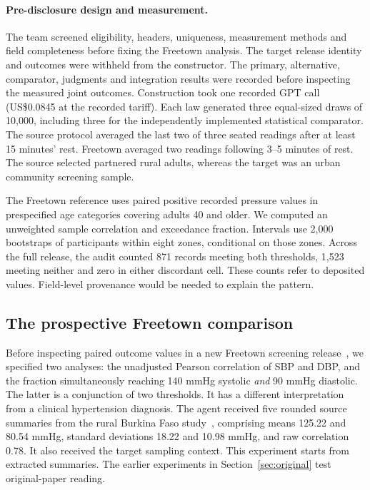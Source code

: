 \paragraph{Pre-disclosure design and measurement.}
The team screened eligibility, headers, uniqueness, measurement methods and field completeness before fixing the Freetown analysis. The target release identity and outcomes were withheld from the constructor. The primary, alternative, comparator, judgments and integration results were recorded before inspecting the measured joint outcomes. Construction took one recorded GPT call (US\$0.0845 at the recorded tariff). Each law generated three equal-sized draws of 10,000, including three for the independently implemented statistical comparator. The source protocol averaged the last two of three seated readings after at least 15 minutes' rest. Freetown averaged two readings following 3--5 minutes of rest. The source selected partnered rural adults, whereas the target was an urban community screening sample.

The Freetown reference uses paired positive recorded pressure values in prespecified age categories covering adults 40 and older. We computed an unweighted sample correlation and exceedance fraction. Intervals use 2,000 bootstraps of participants within eight zones, conditional on those zones. Across the full release, the audit counted 871 records meeting both thresholds, 1,523 meeting neither and zero in either discordant cell. These counts refer to deposited values. Field-level provenance would be needed to explain the pattern.



\subsection{The prospective Freetown comparison}
Before inspecting paired outcome values in a new Freetown screening release~\cite{freetown,freetowndata}, we specified two analyses: the unadjusted Pearson correlation of SBP and DBP, and the fraction simultaneously reaching 140 mmHg systolic \emph{and} 90 mmHg diastolic. The latter is a conjunction of two thresholds. It has a different interpretation from a clinical hypertension diagnosis. The agent received five rounded source summaries from the rural Burkina Faso study~\cite{jaspert}, comprising means 125.22 and 80.54 mmHg, standard deviations 18.22 and 10.98 mmHg, and raw correlation 0.78. It also received the target sampling context. This experiment starts from extracted summaries. The earlier experiments in Section~\ref{sec:original} test original-paper reading.


